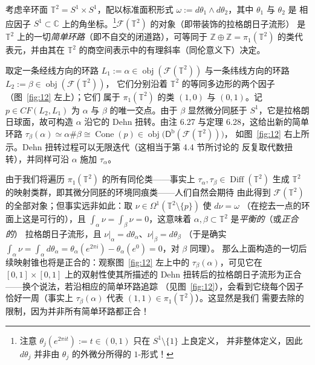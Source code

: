 \begin{Ex}\label{ex:6.30}
考虑辛环面 $\mathbb T^2=S^1\times S^1$，配以标准面积形式
$\omega:=d\theta_1\wedge d\theta_2$，其中 $\theta_1$ 与 $\theta_2$ 是
相应因子 $S^1\subset\mathbb C$ 上的角坐标。\footnote{注意
$\theta_j(e^{2\pi it}):=t\in(0,1)$ 只在 $S^1\setminus\{1\}$ 上良定义，
并非整体定义，因此 $d\theta_j$ 并非由 $\theta_j$ 的外微分所得的
$1$-形式！}$\mathcal F(\mathbb T^2)$ 的对象（即带装饰的拉格朗日子流形）
是 $\mathbb T^2$ 上的一切\emph{简单环路}（即不自交的闭道路），可等同于
$\mathbb Z\oplus\mathbb Z=\pi_1(\mathbb T^2)$ 的类代表元，并由其在
$\mathbb T^2$ 的商空间表示中的有理斜率（同伦意义下）决定。

取定一条经线方向的环路 $L_1:=\alpha\in\operatorname{obj}(\mathcal F(\mathbb T^2))$
与一条纬线方向的环路 $L_2:=\beta\in\operatorname{obj}(\mathcal F(\mathbb T^2))$，
它们分别沿着 $\mathbb T^2$ 的等同多边形的两个因子（图~\ref{fig:12} 左上）；它们
属于 $\pi_1(\mathbb T^2)$ 的类 $(1,0)$ 与 $(0,1)$。记
$p\in CF(L_2,L_1)$ 为 $\alpha$ 与 $\beta$ 的唯一交点。由于 $\beta$
显然微分同胚于 $S^1$，它是拉格朗日球面，故可构造 $\alpha$ 沿它的 Dehn
扭转。由注 6.27 与定理 6.28，这给出新的简单环路
$\tau_\beta(\alpha)\simeq\alpha\#\beta\cong\operatorname{Cone}(p)
\in\operatorname{obj}\bigl(\mathsf D^{\mathrm b}(\mathcal F(\mathbb T^2))\bigr)$，
如图~\ref{fig:12} 右上所示。Dehn 扭转过程可以无限迭代（这相当于第 4.4 节所讨论的
反复取代数扭转），并同样可沿 $\alpha$ 施加 $\tau_\alpha$。

由于我们将遍历 $\pi_1(\mathbb T^2)$ 的所有同伦类——事实上
$\tau_\alpha,\tau_\beta\in\operatorname{Diff}(\mathbb T^2)$ 生成
$\mathbb T^2$ 的映射类群，即其微分同胚的环境同痕类——人们自然会期待
由此得到 $\mathcal F(\mathbb T^2)$ 的全部对象；但事实远非如此：取
$\nu\in\Omega^1(\mathbb T^2\setminus\{p\})$ 使 $d\nu=\omega$
（在挖去一点的环面上这是可行的），且
$\int_\alpha\nu=\int_\beta\nu=0$，这意味着
$\alpha,\beta\subset\mathbb T^2$ 是\emph{平衡的}（或\emph{正合的}）
拉格朗日子流形，且 $\nu|_\alpha=d\theta_\alpha$、$\nu|_\beta=d\theta_\beta$
（于是确实 $\int_\alpha\nu=\int_\alpha d\theta_\alpha
=\theta_\alpha(e^{2\pi i})-\theta_\alpha(e^0)=0$，对 $\beta$ 同理）。
那么上面构造的一切后续映射锥也将是正合的：观察图~\ref{fig:12} 左上中的
$\tau_\beta(\alpha)$，可见它在 $[0,1]\times[0,1]$ 上的双射性使其所描述的
Dehn 扭转后的拉格朗日子流形为正合——换个说法，若沿相应的简单环路追踪
（见图~\ref{fig:12}），会看到它绕每个因子恰好一周（事实上
$\tau_\beta(\alpha)$ 代表 $(1,1)\in\pi_1(\mathbb T^2)$）。这显然是我们
需要去除的限制，因为并非所有简单环路都正合！


\end{Ex}
